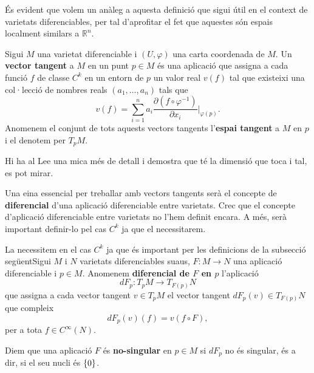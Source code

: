 És evident que volem un anàleg a aquesta definició que sigui útil en el context de varietats diferenciables, per tal d'aprofitar el fet que aquestes són espais localment similars a $\mathbb R^n$. 
\begin{defi}
    Sigui $M$ una varietat diferenciable i $(U,\varphi)$ una carta coordenada de $M$. Un \textbf{vector tangent} a $M$ en un punt $p\in M$ és una aplicació que assigna a cada funció $f$ de classe $C^k$ en un entorn de $p$ un valor real $v(f)$ tal que existeixi una col·lecció de nombres reals $(a_1,\dots,a_n)$ tals que
    \begin{equation*}
        v(f) = \sum_{i=1}^n a_i\frac{\partial (f\circ\varphi^{-1})}{\partial x_i}\Big|_{\varphi(p)}.
    \end{equation*}
    Anomenem el conjunt de tots aquests vectors tangents l'\textbf{espai tangent} a $M$ en $p$ i el denotem per $T_pM$.
\end{defi}
{\color{blue} Hi ha al Lee una mica més de detall i demostra que té la dimensió que toca i tal, es pot mirar.}

Una eina essencial per treballar amb vectors tangents serà el concepte de \textbf{diferencial} d'una aplicació diferenciable entre varietats.
{\color{blue} Crec que el concepte d'aplicació diferenciable entre varietats no l'hem definit encara. A més, serà important definir-lo pel cas $C^k$ ja que el necessitarem.}
\begin{defi}
    {\color{blue} La necessitem en el cas $C^k$ ja que és important per les definicions de la subsecció següent}Sigui $M$ i $N$ varietats diferenciables suaus, $F:M\to N$ una aplicació diferenciable i $p\in M$. Anomenem \textbf{diferencial de $F$ en $p$} l'aplicació
    \begin{equation*}
        dF_p:T_pM\to T_{F(p)}N
    \end{equation*}
    que assigna a cada vector tangent $v\in T_pM$ el vector tangent $dF_p(v)\in T_{F(p)}N$ que compleix
    \begin{equation*}
        dF_p(v)(f) = v(f\circ F),
    \end{equation*}
    per a tota $f\in C^\infty(N)$.
\end{defi}
\begin{defi}
    Diem que una aplicació $F$ és \textbf{no-singular} en $p\in M$ si $dF_p$ no és singular, és a dir, si el seu nucli és $\{0\}$.
\end{defi}

